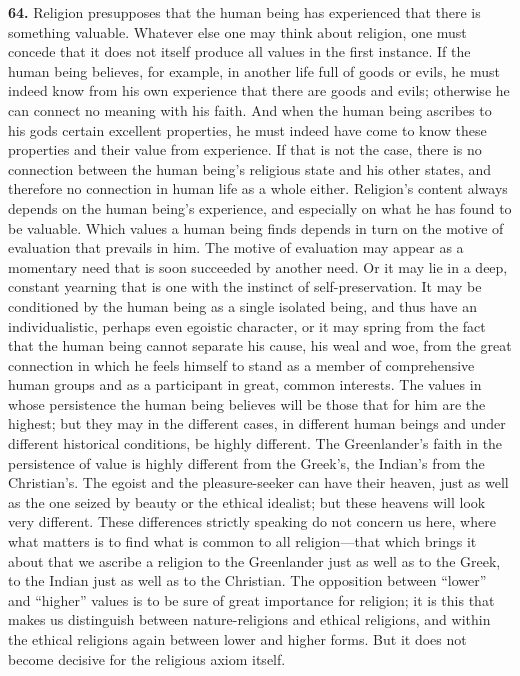 \documentclass[12pt,a4paper]{book}
\newcommand{\opage}[1]{\marginnote{\footnotesize\textit{[#1]}}}
\begin{document}
\noindent\textbf{64.} Religion presupposes that the human being has experienced that there is
something valuable. Whatever else one may think about religion, one must concede that it does not
itself produce all values in the first instance. If the human being believes, for example, in
another life full of goods or evils, he must indeed know from his own experience that there are
goods and evils; otherwise he can connect no meaning with his faith. And when the human being
ascribes to his gods certain excellent properties, he must indeed have come to know these
properties and their value from experience. If that is not the case, there is no connection between
the human being's religious state and his other states, and therefore no connection in human life as
a whole either. 
\opage{147}Religion's content always depends on the human being's experience, and especially on
what he has found to be valuable. Which values a human being finds depends in turn on the motive of
evaluation that prevails in him. The motive of evaluation may appear as a momentary need that is soon
succeeded by another need. Or it may lie in a deep, constant yearning that is one with the instinct of
self-preservation. It may be conditioned by the human being as a single isolated being, and thus have
an individualistic, perhaps even egoistic character, or it may spring from the fact that the human
being cannot separate his cause, his weal and woe, from the great connection in which he feels himself
to stand as a member of comprehensive human groups and as a participant in great, common interests.
The values in whose persistence the human being believes will be those that for him are the highest;
but they may in the different cases, in different human beings and under different historical
conditions, be highly different. The Greenlander's faith in the persistence of value is highly
different from the Greek's, the Indian's from the Christian's. The egoist and the pleasure-seeker can
have their heaven, just as well as the one seized by beauty or the ethical idealist; but these heavens
will look very different. These differences strictly speaking do not concern us here, where what
matters is to find what is common to all religion---that which brings it about that we ascribe a
religion to the Greenlander just as well as to the Greek, to the Indian just as well as to the
Christian. The opposition between ``lower'' and ``higher'' values is to be sure of great importance for
religion; it is this that makes us distinguish between nature-religions and ethical religions, and
within the ethical religions again between lower and higher forms. But it does not become decisive for
the religious axiom itself.
\end{document}
